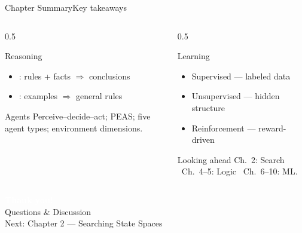 \documentclass[aspectratio=169,11pt]{beamer}
\begin{document}
\begin{frame}{Chapter Summary}{Key takeaways}
  \begin{columns}[T]
    \begin{column}{0.5\textwidth}
      \begin{block}{Reasoning}
        \small
        \begin{itemize}
          \item {}: rules + facts $\Rightarrow$ conclusions
          \item {}: examples $\Rightarrow$ general rules
        \end{itemize}
      \end{block}
      \begin{block}{Agents}
        \small Perceive–decide–act; PEAS; five agent types; environment dimensions.
      \end{block}
    \end{column}
    \begin{column}{0.5\textwidth}
      \begin{exampleblock}{Learning}
        \small
        \begin{itemize}
          \item Supervised — labeled data
          \item Unsupervised — hidden structure
          \item Reinforcement — reward-driven
        \end{itemize}
      \end{exampleblock}
      \begin{alertblock}{Looking ahead}
        \small Ch.\ 2: Search \textbullet\ Ch.\ 4–5: Logic \textbullet\ Ch.\ 6–10: ML.
      \end{alertblock}
    \end{column}
  \end{columns}
\end{frame}

{
\begin{frame}
  \vfill
  \begin{center}
    {\LARGE\textcolor{white}{\textbf{Thank you!}}}\\[0.6em]
    {\small\textcolor{PrimaryLight}{Questions \& Discussion}}\\[1.2em]
    {\footnotesize\textcolor{AccentYellow}{Next: Chapter 2 — Searching State Spaces}}
  \end{center}
  \vfill
\end{frame}}
\end{document}
